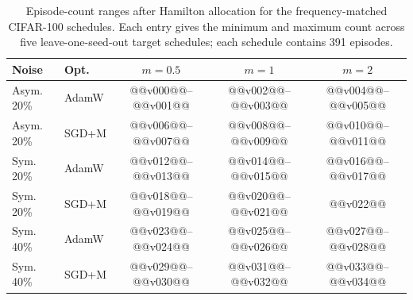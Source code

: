 \begin{table}[H]
\centering
\caption{Episode-count ranges after Hamilton allocation for the
frequency-matched CIFAR-100 schedules. Each entry gives the minimum
and maximum count across five leave-one-seed-out target schedules;
each schedule contains 391 episodes.}
\label{tab:appendix-fm-ranges}
\scriptsize
\setlength{\tabcolsep}{4.0pt}
\renewcommand{\arraystretch}{1.03}
\begin{tabular}{llccc}
\toprule
Noise & Opt. & $m=0.5$ & $m=1$ & $m=2$ \\
\midrule
Asym. 20\% & AdamW & @@v000@@--@@v001@@ & @@v002@@--@@v003@@ & @@v004@@--@@v005@@ \\
Asym. 20\% & SGD+M & @@v006@@--@@v007@@ & @@v008@@--@@v009@@ & @@v010@@--@@v011@@ \\
Sym. 20\% & AdamW & @@v012@@--@@v013@@ & @@v014@@--@@v015@@ & @@v016@@--@@v017@@ \\
Sym. 20\% & SGD+M & @@v018@@--@@v019@@ & @@v020@@--@@v021@@ & @@v022@@ \\
Sym. 40\% & AdamW & @@v023@@--@@v024@@ & @@v025@@--@@v026@@ & @@v027@@--@@v028@@ \\
Sym. 40\% & SGD+M & @@v029@@--@@v030@@ & @@v031@@--@@v032@@ & @@v033@@--@@v034@@ \\
\bottomrule
\end{tabular}
\end{table}
